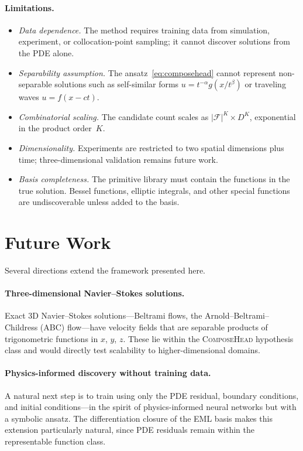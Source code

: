 \paragraph{Limitations.}
\begin{itemize}
  \item \emph{Data dependence.}  The method requires training data from
    simulation, experiment, or collocation-point sampling; it cannot discover
    solutions from the PDE alone.
  \item \emph{Separability assumption.}  The ansatz~\eqref{eq:composehead}
    cannot represent non-separable solutions such as self-similar forms
    $u = t^{-\alpha} g(x/t^{\beta})$ or traveling waves $u = f(x - ct)$.
  \item \emph{Combinatorial scaling.}  The candidate count scales as
    $|\mathcal{F}|^{K} \times D^{K}$, exponential in the product order~$K$.
  \item \emph{Dimensionality.}  Experiments are restricted to two spatial
    dimensions plus time; three-dimensional validation remains future work.
  \item \emph{Basis completeness.}  The primitive library must contain the
    functions in the true solution.  Bessel functions, elliptic integrals, and
    other special functions are undiscoverable unless added to the basis.
\end{itemize}


\section{Future Work}
\label{sec:future}

Several directions extend the framework presented here.

\paragraph{Three-dimensional Navier--Stokes solutions.}
Exact 3D Navier--Stokes solutions---Beltrami flows, the Arnold--Beltrami--%
Childress (ABC) flow---have velocity fields that are separable products of
trigonometric functions in $x$, $y$, $z$.  These lie within the
\textsc{ComposeHead} hypothesis class and would directly test scalability to
higher-dimensional domains.

\paragraph{Physics-informed discovery without training data.}
A natural next step is to train using only the PDE residual, boundary
conditions, and initial conditions---in the spirit of physics-informed neural
networks but with a symbolic ansatz.  The differentiation closure of the EML
basis makes this extension particularly natural, since PDE residuals remain
within the representable function class.

